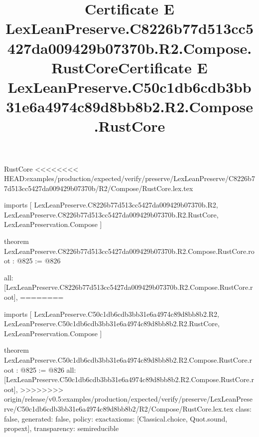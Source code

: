 \begin{lexlean}{RustCore}
<<<<<<<< HEAD:examples/production/expected/verify/preserve/LexLeanPreserve/C8226b77d513cc5427da009429b07370b/R2/Compose/RustCore.lex.tex
\title{Certificate E LexLeanPreserve.C8226b77d513cc5427da009429b07370b.R2.Compose.RustCore}
\begin{coremodule}
imports [
  LexLeanPreserve.C8226b77d513cc5427da009429b07370b.R2,
  LexLeanPreserve.C8226b77d513cc5427da009429b07370b.R2.RustCore,
  LexLeanPreservation.Compose
]

theorem LexLeanPreserve.C8226b77d513cc5427da009429b07370b.R2.Compose.RustCore.root : @825 := @826 {
  all: [LexLeanPreserve.C8226b77d513cc5427da009429b07370b.R2.Compose.RustCore.root],
========
\title{Certificate E LexLeanPreserve.C50c1db6cdb3bb31e6a4974c89d8bb8b2.R2.Compose.RustCore}
\begin{coremodule}
imports [
  LexLeanPreserve.C50c1db6cdb3bb31e6a4974c89d8bb8b2.R2,
  LexLeanPreserve.C50c1db6cdb3bb31e6a4974c89d8bb8b2.R2.RustCore,
  LexLeanPreservation.Compose
]

theorem LexLeanPreserve.C50c1db6cdb3bb31e6a4974c89d8bb8b2.R2.Compose.RustCore.root : @825 := @826 {
  all: [LexLeanPreserve.C50c1db6cdb3bb31e6a4974c89d8bb8b2.R2.Compose.RustCore.root],
>>>>>>>> origin/release/v0.5:examples/production/expected/verify/preserve/LexLeanPreserve/C50c1db6cdb3bb31e6a4974c89d8bb8b2/R2/Compose/RustCore.lex.tex
  class: false,
  generated: false,
  policy: exact{axioms: [Classical.choice, Quot.sound, propext]},
  transparency: semireducible
}


\end{coremodule}}
\end{coremodule}
\end{lexlean}
